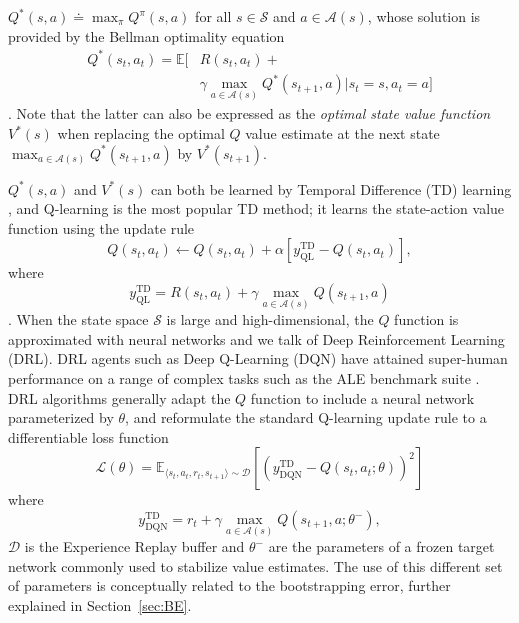 $Q^*\left(s,a\right)\doteq\max_{\pi}Q^{\pi}\left(s,a\right)$ for all
$s\in\mathcal{S}$ and $a\in\mathcal{A}\left(s\right)$, whose solution
is provided by the Bellman optimality equation
\begin{equation}
\begin{aligned}
Q^*\left(s_t,a_t\right)=\mathbb{E}\bigg[&R\left(s_t,a_t\right)+\\ &\gamma
  \max_{a\in\mathcal{A}\left(s\right)}Q^*\left(s_{t+1},a\right)\bigg\vert
  s_t=s,a_t=a \bigg]
\end{aligned}
\end{equation}
\citep{bellman1957dynamic}. Note that the latter can
also be expressed as the \textit{optimal state value function}
$V^*\left(s\right)$ when replacing the optimal $Q$ value estimate at
the next state
$\max_{a\in\mathcal{A}\left(s\right)}Q^*\left(s_{t+1},a\right)$ by
$V^*\left(s_{t+1}\right)$.

$Q^*\left(s,a\right)$ and $V^*\left(s\right)$ can both be learned by
Temporal Difference (TD) learning
\citep{sutton1988learning}, and Q-learning is the most popular TD
method; it learns the state-action value function using the update
rule
\begin{equation}
Q\left(s_t,a_t\right)\leftarrow
Q\left(s_t,a_t\right)+\alpha\left[y^{\scriptscriptstyle
\textrm{TD}}_{\scriptscriptstyle \textrm{QL}}-Q\left(s_t,a_t\right)\right],
\end{equation}
where
\begin{equation}\label{eq:ql_td}
y^{\scriptscriptstyle \textrm{TD}}_{\scriptscriptstyle
\textrm{QL}}=R\left(s_t,a_t\right)+\gamma\max_{a\in\mathcal{A}\left(s\right)}Q\left(s_{t+1},a\right)
\end{equation}
\citep{watkins1992q}. When the state space $\mathcal{S}$ is large and
high-dimensional, the $Q$ function is approximated with
neural networks and we talk of Deep Reinforcement Learning
(DRL). DRL agents such as Deep Q-Learning (DQN)
\citep{mnih2013playing} have attained super-human performance on a
range of complex tasks such as the ALE benchmark suite
\citep{bellemare2013arcade}. DRL algorithms generally adapt the $Q$
function to include a neural network parameterized by $\theta$, and
reformulate the standard Q-learning update rule to a differentiable
loss function
\begin{equation}
\mathcal{L}(\theta)=\mathbb{E}_{\langle s_t,a_t,r_t,s_{t+1}\rangle\sim
\mathcal{D}}\left[{\left(y^{\scriptscriptstyle \textrm{TD}}_{\scriptscriptstyle
\textrm{DQN}}-Q\left(s_t, a_t;\theta\right)\right)}^2\right]
\end{equation}
where
\begin{equation}\label{eq:dqn_td}
y^{\scriptscriptstyle \textrm{TD}}_{\scriptscriptstyle
\textrm{DQN}}=r_t+\gamma\max_{a\in\mathcal{A}(s)}Q\left(s_{t+1},a;\theta^{-}\right),
\end{equation}
$\mathcal{D}$ is the Experience Replay buffer
\citep{lin1992self} and $\theta^-$ are the parameters of a frozen
target network commonly used to stabilize value estimates. The use of
this different set of parameters is conceptually related to the
bootstrapping error, further explained in Section~\ref{sec:BE}.


